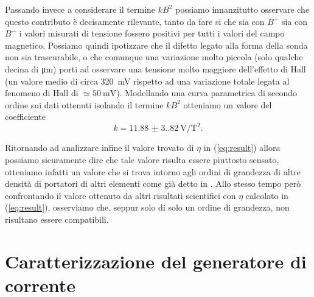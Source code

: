\documentclass[
    prl,
    reprint, 
    superscriptaddress, 
    altaffilletter, 
    amsmath, 
    amssymb, 
    a4paper,
    varvw]{revtex4-2}
\begin{document}
Passando invece a considerare il termine $kB^2$ possiamo innanzitutto osservare che questo contributo è decisamente rilevante, tanto da fare si che sia con $B^+$ sia con $B^-$ i valori misurati di tensione fossero positivi per tutti i valori del campo magnetico. Possiamo quindi ipotizzare che il difetto legato alla forma della sonda non sia trascurabile, o che comunque una variazione molto piccola (solo qualche decina di \si[]{\micro\metre}) porti ad osservare una tensione molto maggiore dell'effetto di Hall (un valore medio di circa \SI{320}{\milli\volt} rispetto ad una variazione totale legata al fenomeno di Hall di $\simeq\SI{50}{\milli\volt}$). Modellando una curva parametrica di secondo ordine sui dati ottenuti isolando il termine $kB^2$ otteniamo un valore del coefficiente \begin{equation}
    k=\SI{11.88(3.82)}{\volt\per\tesla\squared}.
\end{equation}

Ritornando ad analizzare infine il valore trovato di $\eta$ in (\ref{eq:result}) allora possiamo sicuramente dire che tale valore risulta essere piuttosto sensato, otteniamo infatti un valore che si trova intorno agli ordini di grandezza di altre densità di portatori di altri elementi come già detto in \footnotemark[10]. Allo stesso tempo però confrontando il valore ottenuto da altri risultati scientifici \cite{Hasegawa:2006tu,Michenaud:1972wx,Edelman:1977wy} con $\eta$ calcolato in (\ref{eq:result}), osserviamo che, seppur solo di solo un ordine di grandezza, non risultano essere compatibili.


\appendix
\renewcommand{\thefigure}{\thesection\arabic{figure}}

\section{Caratterizzazione del generatore di corrente}\label{sec:appendix_current_gen}
\end{document}
